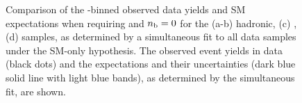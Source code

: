 \begin{figure}[t!]
\begin{center}
{    } 
    \caption{\label{fig:best-fit-le3j0b} Comparison of the
      \scalht-binned observed data yields and SM expectations when
      requiring \njetlow and $n_{\text{b}} = 0$ for the (a-b) hadronic, (c)
      \mj, (d) \gj samples, as determined by a
      simultaneous fit to all data samples under the SM-only
      hypothesis. The observed event yields in data (black dots) and
      the expectations and their uncertainties (dark blue solid line
      with light blue bands), as determined by the simultaneous fit,
      are shown. %
      }
  \end{center}
\end{figure}

